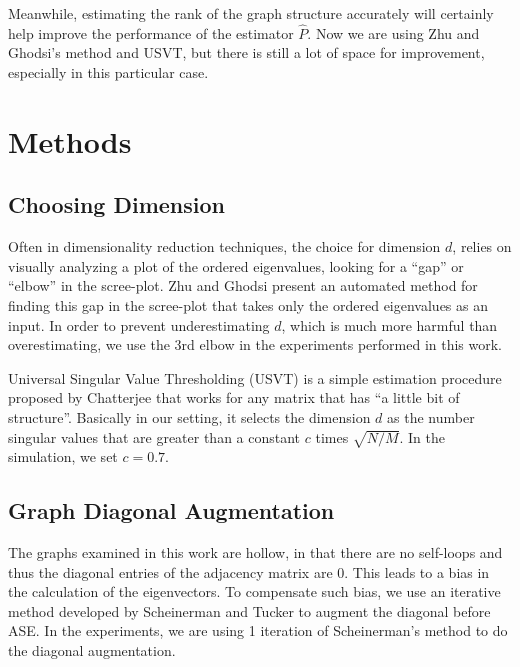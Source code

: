 \documentclass[a4paper]{article}
\begin{document}
Meanwhile, estimating the rank of the graph structure accurately will certainly help improve the performance of the estimator $\hat{P}$. Now we are using Zhu and Ghodsi's method and USVT, but there is still a lot of space for improvement, especially in this particular case.







\section{Methods}

\subsection{Choosing Dimension}
\label{section:dim_select}
Often in dimensionality reduction techniques, the choice for dimension $d$, relies on visually analyzing a plot of the ordered eigenvalues, looking for a ``gap'' or ``elbow'' in the scree-plot. Zhu and Ghodsi \cite{zhu2006automatic} present an automated method for finding this gap in the scree-plot that takes only the ordered eigenvalues as an input. In order to prevent underestimating $d$, which is much more harmful than overestimating, we use the 3rd elbow in the experiments performed in this work.

Universal Singular Value Thresholding (USVT) \cite{chatterjee2015matrix} is a simple estimation procedure proposed by Chatterjee that works for any matrix that has ``a little bit of structure''. Basically in our setting, it selects the dimension $d$ as the number singular values that are greater than a constant $c$ times $\sqrt{N/M}$. In the simulation, we set $c = 0.7$.



\subsection{Graph Diagonal Augmentation}
\label{section:diag_aug}
The graphs examined in this work are hollow, in that there are no self-loops and thus the diagonal entries of the adjacency matrix are 0. This leads to a bias in the calculation of the eigenvectors. To compensate such bias, we use an iterative method developed by Scheinerman and Tucker \cite{scheinerman2010modeling} to augment the diagonal before ASE. In the experiments, we are using 1 iteration of Scheinerman's method to do the diagonal augmentation.
\end{document}
